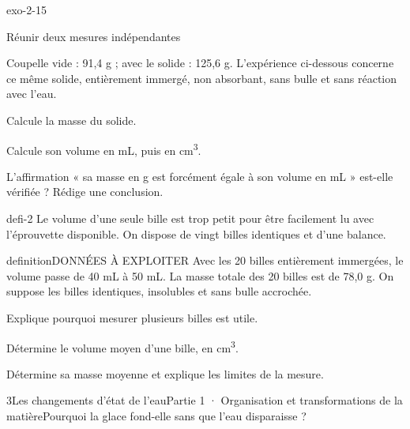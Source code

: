\documentclass[12pt,twoside,openany]{book}
\begin{document}
\begin{blocLivre}{exo-2-15}
\begin{exercice}[3]{Réunir deux mesures indépendantes}
\begin{donnees}Coupelle vide : 91,4 g ; avec le solide : 125,6 g. L’expérience ci-dessous concerne ce même solide, entièrement immergé, non absorbant, sans bulle et sans réaction avec l’eau.\par
\end{donnees}
\begin{questions}
\item Calcule la masse du solide.
\item Calcule son volume en mL, puis en cm\textsuperscript{3}.
\item L’affirmation « sa masse en g est forcément égale à son volume en mL » est-elle vérifiée ? Rédige une conclusion.
\end{questions}
\end{exercice}\end{blocLivre}
\label{defi-ex-2}
\begin{pcFiche}{defi-2}
Le volume d’une seule bille est trop petit pour être facilement lu avec l’éprouvette disponible. On dispose de vingt billes identiques et d’une balance.\par
{}
\begin{pcEncadre}{definition}{DONNÉES À EXPLOITER}
Avec les 20 billes entièrement immergées, le volume passe de 40 mL à 50 mL. La masse totale des 20 billes est de 78,0 g. On suppose les billes identiques, insolubles et sans bulle accrochée.\par
\end{pcEncadre}
\begin{questions}
\item Explique pourquoi mesurer plusieurs billes est utile.
\item Détermine le volume moyen d’une bille, en cm\textsuperscript{3}.
\item Détermine sa masse moyenne et explique les limites de la mesure.
\end{questions}
\end{pcFiche}
\clearpage\pagestyle{otMain}
\begin{ouverture}[college1]{3}{Les changements d’état de l’eau}{Partie 1 · Organisation et transformations de la matière}{Pourquoi la glace fond-elle sans que l’eau disparaisse ?}
\end{ouverture}
\end{document}
